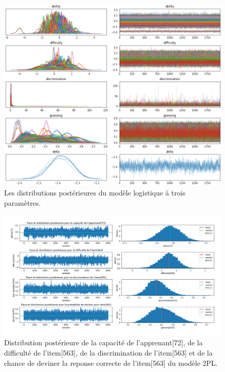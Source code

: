 \begin{figure}[H]
	\begin{center}
		\includegraphics[width=\textwidth]{images/annexe/model_plot-trace3.png}
	\end{center}
	\caption{Les distributions postérieures du modèle logistique à trois paramètres.}
	\label{model_trace-plot3}
\end{figure}

\begin{figure}[H]
	\begin{center}
		\includegraphics[width=\textwidth]{images/annexe/params_posterior_distribution3.png}
	\end{center}
	\caption{Distribution postérieure de la capacité de l’apprenant[72], de la difficulté de l’item[563], de la discrimination de l’item[563] et de la chance de deviner la reponse correcte de l'item[563] du modèle 2PL.}
	\label{params_posterior_distribution_3pl}
\end{figure}

